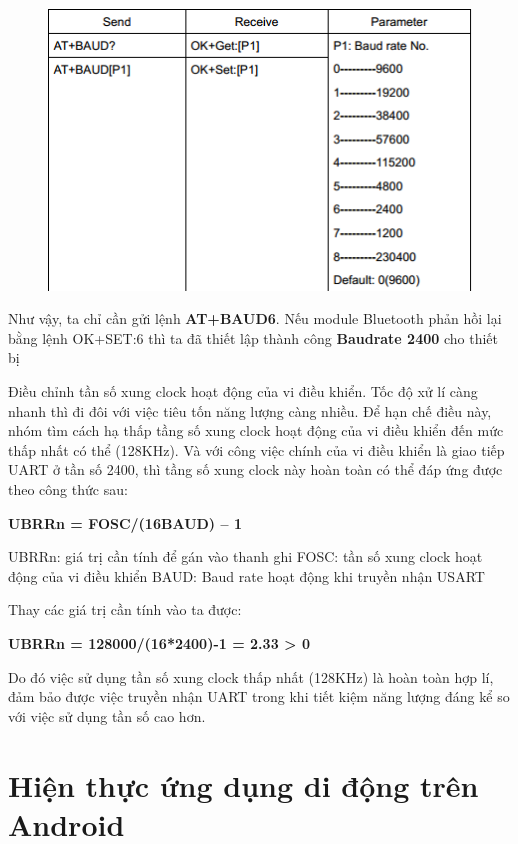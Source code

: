 	\begin{figure}[H]
		\centering    
		\includegraphics[width=1\textwidth]{baud}
		\label{fig: baud}
	\end{figure}

Như vậy, ta chỉ cần gửi lệnh \textbf{AT+BAUD6}. Nếu module Bluetooth phản hồi lại bằng lệnh OK+SET:6 thì ta đã thiết lập thành công \textbf{Baudrate 2400} cho thiết bị

Điều chỉnh tần số xung clock hoạt động của vi điều khiển.
Tốc độ xử lí càng nhanh thì đi đôi với việc tiêu tốn năng lượng càng nhiều. Để hạn chế điều này, nhóm tìm cách hạ thấp tầng số xung clock hoạt động của vi điều khiển đến mức thấp nhất có thể (128KHz). Và với công việc chính của vi điều khiển là giao tiếp UART ở tần số 2400, thì tầng số xung clock này hoàn toàn có thể đáp ứng được theo công thức sau: 

\textbf{UBRRn = FOSC/(16BAUD) – 1}

UBRRn: giá trị cần tính để gán vào thanh ghi
FOSC: tần số xung clock hoạt động của vi điều khiển
BAUD: Baud rate hoạt động khi truyền nhận USART

Thay các giá trị cần tính vào ta được:

\textbf{UBRRn = 128000/(16*2400)-1 = 2.33 > 0}

Do đó việc sử dụng tần số xung clock thấp nhất (128KHz) là hoàn toàn hợp lí, đảm bảo được việc truyền nhận UART trong khi tiết kiệm năng lượng đáng kể so với việc sử dụng tần số cao hơn.
\section{Hiện thực ứng dụng di động trên Android}


